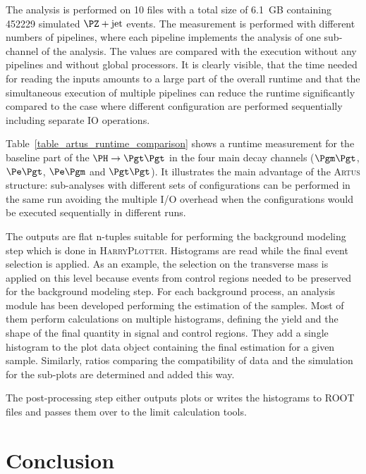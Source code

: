 \documentclass[3p]{elsarticle}
\newcommand{\software}[1]{\textsc{#1}\xspace}
\newcommand{\artus}{\software{Artus}}
\newcommand{\harryplotter}{\software{HarryPlotter}}
\begin{document}
\begin{table}[!ht]
{The analysis is performed on 10 files with a total size of 6.1~GB containing 452229 simulated $\PZ+\text{jet}$ events.
The measurement is performed with different numbers of pipelines, where each pipeline implements the analysis of one sub-channel of the analysis.
The values are compared with the execution without any pipelines and without global processors.
It is clearly visible, that the time needed for reading the inputs amounts to a large part of the overall runtime and that the simultaneous execution of multiple pipelines can reduce the runtime significantly compared to the case where different configuration are performed sequentially including separate IO operations.}
\label{table_artus_runtime_comparison}
\end{table}

Table~\ref{table_artus_runtime_comparison} shows a runtime measurement for the baseline part of the $\PH\to\Pgt\Pgt$ in the four main decay channels ($\Pgm\Pgt$, $\Pe\Pgt$, $\Pe\Pgm$ and $\Pgt\Pgt$).
It illustrates the main advantage of the \artus structure: sub-analyses with different sets of configurations can be performed in the same run avoiding the multiple I/O overhead when the configurations would be executed sequentially in different runs.

The outputs are flat n-tuples suitable for performing the background modeling step which is done in \harryplotter.
Histograms are read while the final event selection is applied.
As an example, the selection on the transverse mass is applied on this level because events from control regions needed to be preserved for the background modeling step.
For each background process, an analysis module has been developed performing the estimation of the samples.
Most of them perform calculations on multiple histograms, defining the yield and the shape of the final quantity in signal and control regions.
They add a single histogram to the plot data object containing the final estimation for a given sample.
Similarly, ratios comparing the compatibility of data and the simulation for the sub-plots are determined and added this way.

The post-processing step either outputs plots or writes the histograms to ROOT files and passes them over to the limit calculation tools.

\section{Conclusion}
\label{section_conclusion}
\end{document}
